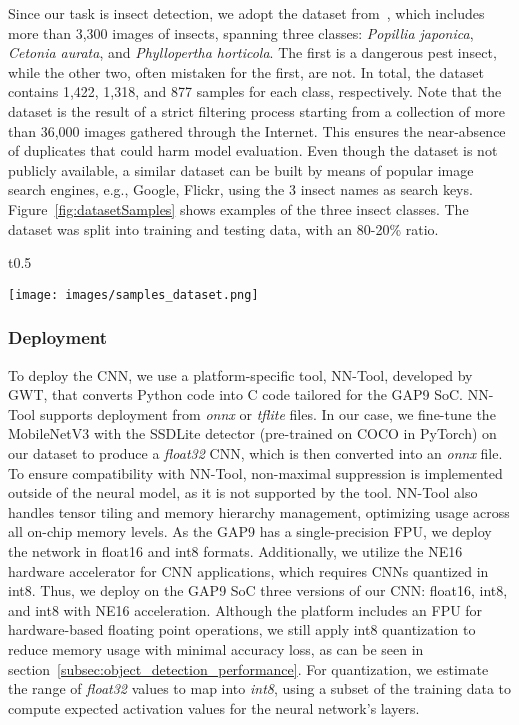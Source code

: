 Since our task is insect detection, we adopt the dataset from~\citet{9601235}, which includes more than 3,300 images of insects, spanning three classes: \textit{Popillia japonica}, \textit{Cetonia aurata}, and \textit{Phyllopertha horticola}. 
The first is a dangerous pest insect, while the other two, often mistaken for the first, are not.
In total, the dataset contains 1,422, 1,318, and 877 samples for each class, respectively.
Note that the dataset is the result of a strict filtering process starting from a collection of more than 36,000 images gathered through the Internet. 
This ensures the near-absence of duplicates that could harm model evaluation.
Even though the dataset is not publicly available, a similar dataset can be built by means of popular image search engines, e.g., Google, Flickr, using the 3 insect names as search keys.
Figure~\ref{fig:datasetSamples} shows examples of the three insect classes.
The dataset was split into training and testing data, with an 80-20\% ratio.

\begin{wrapfigure}{t}{0.5\textwidth}
  \begin{center}
    \texttt{[image: images/samples\_dataset.png]}
  \end{center}
  \caption{\label{fig:datasetSamples}Samples of the three classes in our dataset~\citep{9601235}.}
\end{wrapfigure}


\subsubsection{Deployment}

To deploy the CNN, we use a platform-specific tool, NN-Tool, developed by GWT, that converts Python code into C code tailored for the GAP9 SoC.
NN-Tool supports deployment from \textit{onnx} or \textit{tflite} files. 
In our case, we fine-tune the MobileNetV3 with the SSDLite detector (pre-trained on COCO in PyTorch) on our dataset to produce a \textit{float32} CNN, which is then converted into an \textit{onnx} file. 
To ensure compatibility with NN-Tool, non-maximal suppression is implemented outside of the neural model, as it is not supported by the tool. 
NN-Tool also handles tensor tiling and memory hierarchy management, optimizing usage across all on-chip memory levels. 
As the GAP9 has a single-precision FPU, we deploy the network in float16 and int8 formats.
Additionally, we utilize the NE16 hardware accelerator for CNN applications, which requires CNNs quantized in int8. 
Thus, we deploy on the GAP9 SoC three versions of our CNN: float16, int8, and int8 with NE16 acceleration.
Although the platform includes an FPU for hardware-based floating point operations, we still apply int8 quantization to reduce memory usage with minimal accuracy loss, as can be seen in section~\ref{subsec:object_detection_performance}.
For quantization, we estimate the range of \textit{float32} values to map into \textit{int8}, using a subset of the training data to compute expected activation values for the neural network's layers.


